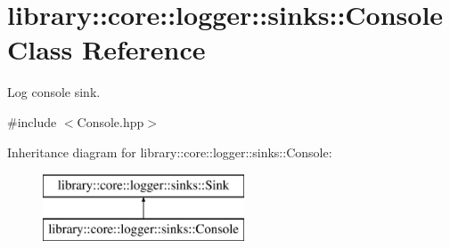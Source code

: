 \hypertarget{classlibrary_1_1core_1_1logger_1_1sinks_1_1_console}{}\section{library\+::core\+::logger\+::sinks\+::Console Class Reference}
\label{classlibrary_1_1core_1_1logger_1_1sinks_1_1_console}


Log console sink.  




{\ttfamily \#include $<$Console.\+hpp$>$}

Inheritance diagram for library\+::core\+::logger\+::sinks\+::Console\+:\begin{figure}[H]
\begin{center}
\leavevmode
\includegraphics[height=2.000000cm]{classlibrary_1_1core_1_1logger_1_1sinks_1_1_console}
\end{center}
\end{figure}
